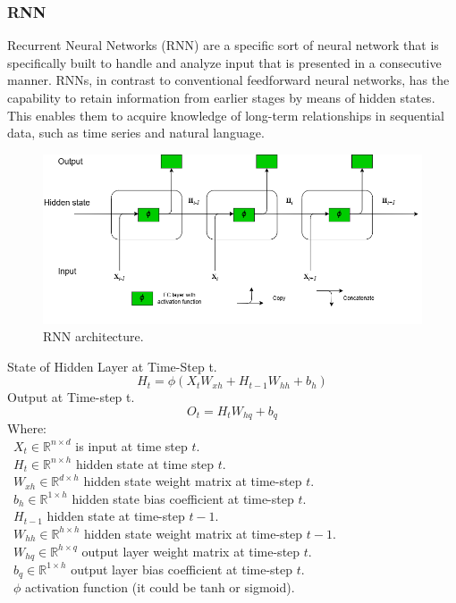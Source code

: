\documentclass{ieeeojies}
\begin{document}
\subsubsection{RNN}
Recurrent Neural Networks (RNN) are a specific sort of neural network that is specifically built to handle and analyze input that is presented in a consecutive manner. RNNs, in contrast to conventional feedforward neural networks, has the capability to retain information from earlier stages by means of hidden states. This enables them to acquire knowledge of long-term relationships in sequential data, such as time series and natural language.
\begin{figure}[H]
  \centering
  \begin{minipage}{1\linewidth}
    \centering
    \includegraphics[width=\linewidth]{image/RNN1.png}
    \caption{RNN architecture.}
    \label{fig8}
  \end{minipage}
\end{figure}
\noindent State of Hidden Layer at Time-Step t.
\[H_t = \phi(X_t W_{xh} + H_{t-1} W_{hh} + b_h)\]
Output at Time-step t.
\[ O_t = H_t W_{hq} + b_q \]
Where:\\
	\indent\textbullet\ \(X_t\in \mathbb{R}^{n \times d}\) is input at time step \(t\).\\
        \indent\textbullet\ \(H_t\in \mathbb{R}^{n \times h}\) hidden state at time step \(t\).\\
	\indent\textbullet\ \(W_{xh}\in \mathbb{R}^{d \times h}\) hidden state weight matrix at time-step \(t\).\\
	\indent\textbullet\ \(b_h\in \mathbb{R}^{1 \times h}\) hidden state bias coefficient at time-step \(t\).\\
	\indent\textbullet\ \(H_{t-1}\) hidden state at time-step \(t-1\).\\
        \indent\textbullet\  \(W_{hh} \in \mathbb{R}^{h \times h}\) hidden state weight matrix at time-step \(t-1\).\\
        \indent\textbullet\ \(W_{hq} \in \mathbb{R}^{h \times q}\) output layer weight matrix at time-step \(t\).\\
        \indent\textbullet\ \(b_q \in \mathbb{R}^{1 \times h}\) output layer bias coefficient at time-step \(t\).\\
        \indent\textbullet\ \(\phi\) activation function (it could be tanh or sigmoid).      
\end{document}
